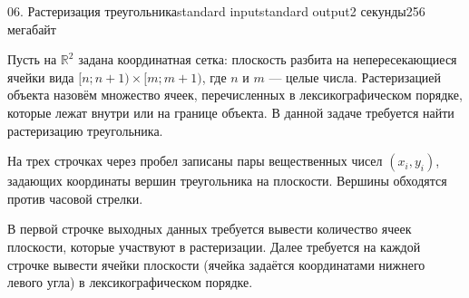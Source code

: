 \begin{problem}{06. Растеризация треугольника}{standard input}{standard output}{2 секунды}{256 мегабайт}

Пусть на $\mathbb R^2$ задана координатная сетка: плоскость разбита на непересекающиеся ячейки вида $[n; n + 1) \times [m; m + 1)$, где $n$ и $m$ --- целые числа. Растеризацией объекта назовём множество ячеек, перечисленных в лексикографическом порядке, которые лежат внутри или на границе объекта. В данной задаче требуется найти растеризацию треугольника.

\InputFile

На трех строчках через пробел записаны пары вещественных чисел $(x_i, y_i)$, задающих координаты вершин треугольника на плоскости. Вершины обходятся против часовой стрелки.

\OutputFile

В первой строчке выходных данных требуется вывести количество ячеек плоскости, которые участвуют в растеризации. Далее требуется на каждой строчке вывести ячейки плоскости (ячейка задаётся координатами нижнего левого угла) в лексикографическом порядке.

\Examples

\begin{example}%
%
\end{example}

\end{problem}
